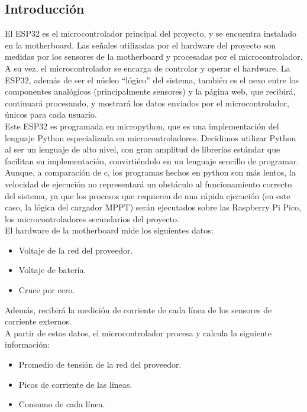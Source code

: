 \subsection{Introducción}

El ESP32 es el microcontrolador principal del proyecto, y se encuentra instalado en la motherboard. Las señales utilizadas por el hardware del proyecto son medidas por los sensores de la motherboard y procesadas por el microcontrolador. A su vez, el microcontrolador se encarga de controlar y operar el hardware. La ESP32, además de ser el núcleo “lógico” del sistema, también es el nexo entre los componentes analógicos (principalmente sensores) y la página web, que recibirá, continuará procesando, y mostrará los datos enviados por el microcontrolador, únicos para cada usuario.\\

Este ESP32 es programada en micropython, que es una implementación del lenguaje Python especializada en microcontroladores. Decidimos utilizar Python al ser un lenguaje de alto nivel, con gran amplitud de librerías estándar que facilitan su implementación, convirtiéndolo en un lenguaje sencillo de programar. Aunque, a comparación de c, los programas hechos en python son más lentos, la velocidad de ejecución no representará un obstáculo al funcionamiento correcto del sistema, ya que los procesos que requieren de una rápida ejecución (en este caso, la lógica del cargador MPPT) serán ejecutados sobre las Raspberry Pi Pico, los microcontroladores secundarios del proyecto.\\

El hardware de la motherboard mide los siguientes datos:

\begin{itemize}
    \item Voltaje de la red del proveedor.
    \item Voltaje de batería.
    \item Cruce por cero.
\end{itemize}
Además, recibirá la medición de corriente de cada línea de los sensores de corriente externos.\\

A partir de estos datos, el microcontrolador procesa y calcula la siguiente información:
\begin{itemize}
    \item Promedio de tensión de la red del proveedor.
    \item Picos de corriente de las líneas.
    \item Consumo de cada línea.
\end{itemize}

